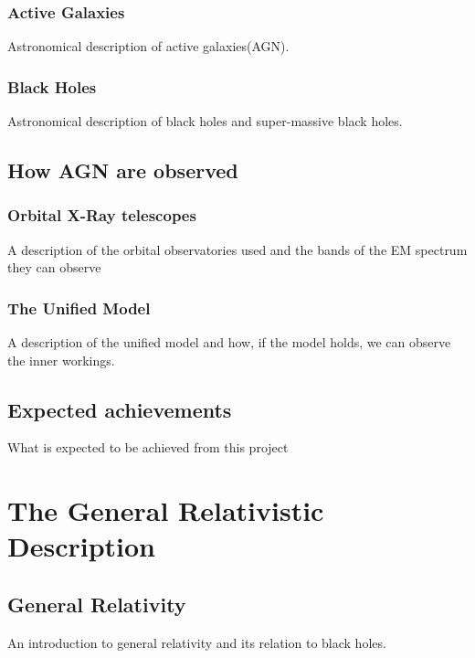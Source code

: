 \documentclass[12pt, oneside]{smuthesis}
\begin{document}
\subsection{\sc Active Galaxies}

Astronomical description of active galaxies(AGN).

\subsection{\sc Black Holes}

Astronomical description of black holes and super-massive black holes.


\section{\sc How AGN are observed}

\subsection{\sc Orbital X-Ray telescopes}

A description of the orbital observatories used and the bands of the EM spectrum they can observe

\subsection{\sc The Unified Model}

A description of the unified model and how, if the model holds, we can observe the inner workings.

\section{\sc Expected achievements}

What is expected to be achieved from this project

\newpage

\chapter{\sc The General Relativistic Description}

\section{\sc General Relativity}

An introduction to general relativity and its relation to black holes.
\end{document}
